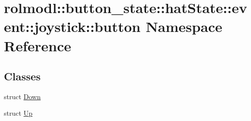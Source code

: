 \hypertarget{namespacerolmodl_1_1button__state_1_1hat_state_1_1event_1_1joystick_1_1button}{}\section{rolmodl\+::button\+\_\+state\+::hat\+State\+::event\+::joystick\+::button Namespace Reference}
\label{namespacerolmodl_1_1button__state_1_1hat_state_1_1event_1_1joystick_1_1button}
\subsection*{Classes}
\begin{DoxyCompactItemize}
\item 
struct \mbox{\hyperlink{structrolmodl_1_1button__state_1_1hat_state_1_1event_1_1joystick_1_1button_1_1_down}{Down}}
\item 
struct \mbox{\hyperlink{structrolmodl_1_1button__state_1_1hat_state_1_1event_1_1joystick_1_1button_1_1_up}{Up}}
\end{DoxyCompactItemize}
